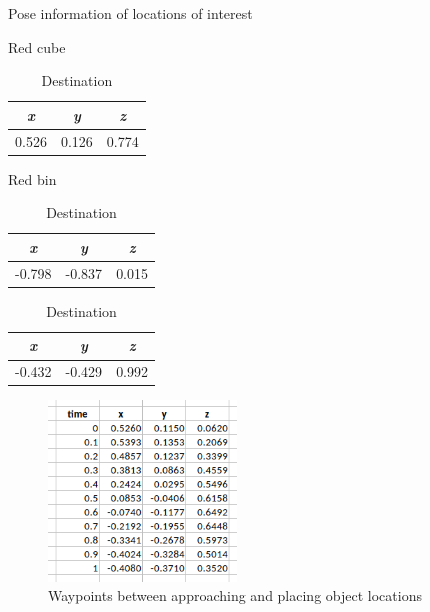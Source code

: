 \documentclass[12pt]{article}
\begin{document}
\begin{enumerate}
\begin{enumerate}
        \begin{table}[H]
            \caption{Pose information of locations of interest}
            \begin{subtable}{.32\linewidth}
                \centering
                \caption{Red cube}
                \begin{tabular}{ccc}
                    \toprule
                    \textit{x} & \textit{y} & \textit{z} \\\midrule
                    0.526 & 0.126 & 0.774 \\\bottomrule
                \end{tabular}
            \end{subtable}
            \hfill
            \begin{subtable}{.32\linewidth}
                \centering
                \caption{Red bin}
                \begin{tabular}{ccc}
                    \toprule
                    \textit{x} & \textit{y} & \textit{z} \\\midrule
                    -0.798 & -0.837 & 0.015 \\\bottomrule
                \end{tabular}
            \end{subtable}
            \hfill
            \begin{subtable}{.32\linewidth}
                \centering
                \caption{Destination}
                \begin{tabular}{ccc}
                    \toprule
                    \textit{x} & \textit{y} & \textit{z} \\\midrule
                    -0.432 & -0.429 & 0.992 \\\bottomrule
                \end{tabular}
            \end{subtable}
        \end{table}

        \begin{figure}[H]
            \vspace{-10pt}
            \centering\includegraphics[width=5cm]{images/waypoints.png}
            \caption{Waypoints between approaching and placing object locations}\label{fig:waypoints}
        \end{figure}


\end{enumerate}
\end{enumerate}
\end{document}
